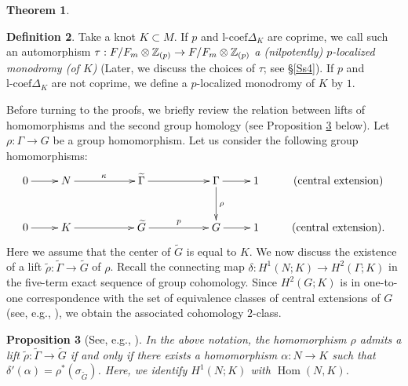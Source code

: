 \documentclass{article}
\theoremstyle{plain}
\newtheorem{thm}{Theorem}[section]
\newtheorem{prop}[thm]{Proposition}
\theoremstyle{definition}
\newtheorem{rem}[thm]{Remark}
\newtheorem{defn}[thm]{Definition}
\def\Hom{\mathop{\mathrm{Hom}}\nolimits}
\newcommand{\ra}{\rightarrow}
\newcommand{\N}{{\Bbb N}}
\newcommand{\Z}{{\Bbb Z}}
\newcommand{\lc}{{\mathrm{l}\textrm{-}\mathrm{coef}}}
\begin{document}
{\begin{thm}
\end{thm}


\begin{defn}\label{bb3312}
Take a knot $K \subset M$. If $p$ and $ \lc \Delta_K $ are coprime, we call such an automorphism $\tau : F/F_m \otimes \Z_{(p)} \ra F /F_m \otimes \Z_{(p)}$ {\it a (nilpotently) $p$-localized monodromy (of $K$)} (Later, we discuss the choices of $\tau$; see \S \ref{Ss4}). If $p$ and $ \lc \Delta_K $ are not coprime, we define a $p$-localized monodromy of $K$ by $1$.
\end{defn}
Before turning to the proofs, we briefly review the relation between lifts of homomorphisms and the second group homology (see Proposition \ref{Projprop1} below). Let $\rho: \Gamma \to G$ be a group homomorphism. Let us consider the following group homomorphisms:
\[
{\normalsize
\xymatrix{
0\ar[r] & N \ar[rr]^{\kappa} & & \widetilde{\Gamma} \ar[rr]& & \Gamma \ar[d] ^{ \rho} \ar[r] & 1& (\textrm{central extension})\\
0\ar[r] & K\ar[rr] & & \widetilde{G} \ar[rr]^{p} & & G \ar[r] & 1& (\textrm{central extension}).
}}\]
Here we assume that the center of $\widetilde{G}$ is equal to $K$.
We now discuss the existence of a lift $\widetilde{\rho}: \widetilde{\Gamma} \to \widetilde{G}$ of $\rho$.
Recall the connecting map $\delta : H^1( N; K ) \ra H^2( \Gamma ; K)$ in the five-term exact sequence of group cohomology. Since $H^2(G; K)$ is in one-to-one correspondence with the set of equivalence classes of central extensions of $G$ (see, e.g., \cite[Sections 3--4]{BT}), we obtain the associated cohomology $2$-class.

\begin{prop}
[{See, e.g., \cite[Propositions 2.1.8 and 2.1.9]{BT}}]\label{Projprop1} In the above notation, the homomorphism $\rho$ admits a lift $\widetilde{\rho}: \widetilde{\Gamma} \to \widetilde{G}$ if and only if there exists a homomorphism $\alpha: N \to K$ such that
$ \delta ' (\alpha) = \rho^* ( \sigma_{\widetilde{G} }) $. Here, we identify $H^1(N;K) $ with $\Hom(N,K )$.


\end{prop}}
\end{document}
